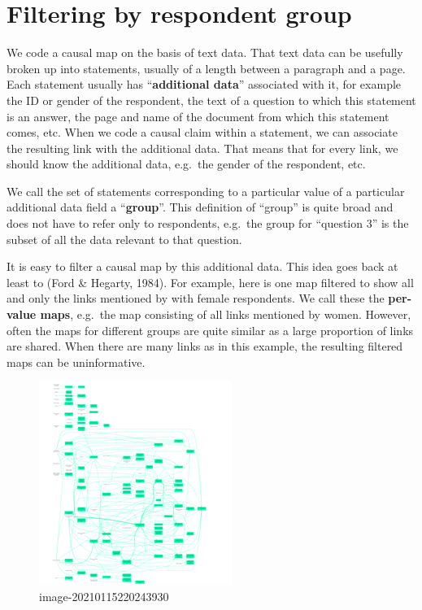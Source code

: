 \documentclass[
]{book}
\begin{document}
\hypertarget{filtering-by-respondent-group}{%
\section{Filtering by respondent group}\label{filtering-by-respondent-group}}

We code a causal map on the basis of text data. That text data can be usefully broken up into statements, usually of a length between a paragraph and a page. Each statement usually has ``\textbf{additional data}'' associated with it, for example the ID or gender of the respondent, the text of a question to which this statement is an answer, the page and name of the document from which this statement comes, etc. When we code a causal claim within a statement, we can associate the resulting link with the additional data. That means that for every link, we should know the additional data, e.g.~the gender of the respondent, etc.

We call the set of statements corresponding to a particular value of a particular additional data field a ``\textbf{group}''. This definition of ``group'' is quite broad and does not have to refer only to respondents, e.g.~the group for ``question 3'' is the subset of all the data relevant to that question.

It is easy to filter a causal map by this additional data. This idea goes back at least to (Ford \& Hegarty, 1984). For example, here is one map filtered to show all and only the links mentioned by with female respondents. We call these the \textbf{per-value maps}, e.g.~the map consisting of all links mentioned by women. However, often the maps for different groups are quite similar as a large proportion of links are shared. When there are many links as in this example, the resulting filtered maps can be uninformative.

\begin{figure}
\centering
\includegraphics{_assets/image-20210115220243930.png}
\caption{image-20210115220243930}
\end{figure}
\end{document}
